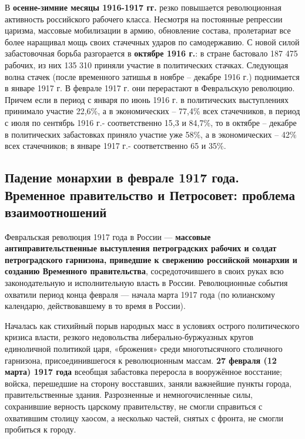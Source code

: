\documentclass{article}
\begin{document}
\hfill

В \textbf{осенне-зимние месяцы 1916-1917 гг.} резко повышается революционная активность российского рабочего класса. Несмотря на постоянные репрессии царизма, массовые мобилизации в армию, обновление состава, пролетариат все более наращивал мощь своих стачечных ударов по самодержавию. С новой силой забастовочная борьба разгорается в \textbf{октябре 1916 г.}: в стране бастовало 187 475 рабочих, из них 135 310 приняли участие в политических стачках. Следующая волна стачек (после временного затишья в ноябре – декабре 1916 г.) поднимается в январе 1917 г. В феврале 1917 г. они перерастают в Февральскую революцию. Причем если в период с января по июнь 1916 г. в политических выступлениях принимало участие 22,6\%, а в экономических – 77,4\% всех стачечников, в период с июля по сентябрь 1916 г.- соответственно 15,3 и 84,7\%, то в октябре – декабре в политических забастовках приняло участие уже 58\%, а в экономических – 42\% всех стачечников; в январе 1917 г.- соответственно 65 и 35\%.

\pagebreak
\subsection{Падение монархии в феврале 1917 года. Временное правительство и Петросовет: проблема взаимоотношений}

Февральская революция 1917 года в России — \textbf{массовые антиправительственные выступления петроградских рабочих и солдат петроградского гарнизона, приведшие к свержению российской монархии и созданию Временного правительства}, сосредоточившего в своих руках всю законодательную и исполнительную власть в России. Революционные события охватили период конца февраля — начала марта 1917 года (по юлианскому календарю, действовавшему в то время в России).

\hfill

Началась как стихийный порыв народных масс в условиях острого политического кризиса власти, резкого недовольства либерально-буржуазных кругов единоличной политикой царя, «брожения» среди многотысячного столичного гарнизона, присоединившегося к революционным массам. \textbf{27 февраля (12 марта) 1917 года} всеобщая забастовка переросла в вооружённое восстание; войска, перешедшие на сторону восставших, заняли важнейшие пункты города, правительственные здания. Разрозненные и немногочисленные силы, сохранившие верность царскому правительству, не смогли справиться с охватившим столицу хаосом, а несколько частей, снятых с фронта, не смогли пробиться к городу.
\end{document}
